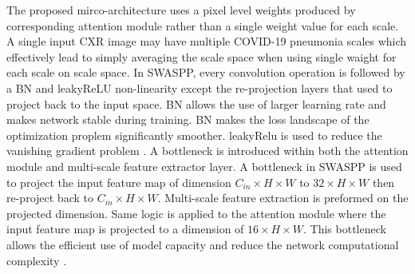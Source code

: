 The proposed mirco-architecture uses a pixel level weights produced by corresponding attention module rather than a single weight value for each scale. A single input CXR image may have multiple COVID-19 pneumonia scales which effectively lead to simply averaging the scale space when using single waight for each scale on scale space. In SWASPP, every convolution operation is followed by a BN and leakyReLU \cite{krizhevsky2012imagenet} non-linearity except the re-projection layers that used to project back to the input space. 
BN allows the use of larger learning rate\cite{ioffe2015batch} and makes network stable during training\cite{ioffe2015batch}. BN makes the loss landscape of the optimization proplem significantly smoother\cite{santurkar2018does}.
leakyRelu is used to reduce the vanishing gradient problem \cite{krizhevsky2012imagenet}.
A bottleneck is introduced within both the attention module and multi-scale feature extractor layer. A bottleneck in SWASPP is used to project the input feature map of dimension $C_{in}\times H\times W$ to $32\times H\times W$ then re-project back to $C_{in}\times H\times W$. Multi-scale feature extraction is preformed on the projected dimension. Same logic is applied to the attention module where the input feature map is projected to a dimension of $16\times H\times W$.
This bottleneck allows the efficient use of model capacity and reduce the network computational complexity \cite{huang2017densely}. 


